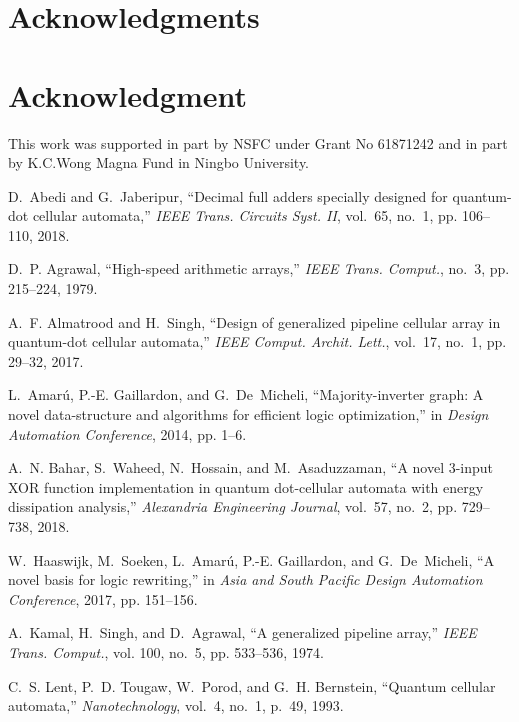 \documentclass[9pt,journal,compsoc]{IEEEtran}
\begin{document}
\vspace{-2ex}
\ifCLASSOPTIONcompsoc
  \section*{Acknowledgments}
\else
  \section*{Acknowledgment}
\fi
This work was supported in part by NSFC under Grant No 61871242 and in part by K.C.Wong Magna Fund in Ningbo University.
\vspace{-2ex}
\ifCLASSOPTIONcaptionsoff
  \newpage
\fi
\tiny


\begin{thebibliography}{10}

D.~{Abedi} and G.~{Jaberipur}, ``Decimal full adders specially designed for
  quantum-dot cellular automata,'' \emph{{IEEE} Trans. Circuits Syst. {II}},
  vol.~65, no.~1, pp. 106--110, 2018.

D.~P. Agrawal, ``High-speed arithmetic arrays,'' \emph{{IEEE} Trans. Comput.},
  no.~3, pp. 215--224, 1979.

A.~F. Almatrood and H.~Singh, ``Design of generalized pipeline cellular array
  in quantum-dot cellular automata,'' \emph{{IEEE} Comput. Archit. Lett.},
  vol.~17, no.~1, pp. 29--32, 2017.

L.~Amar{\'u}, P.-E. Gaillardon, and G.~De~Micheli, ``Majority-inverter graph: A
  novel data-structure and algorithms for efficient logic optimization,'' in
  \emph{Design Automation Conference}, 2014, pp. 1--6.

A.~N. Bahar, S.~Waheed, N.~Hossain, and M.~Asaduzzaman, ``A novel 3-input {XOR}
  function implementation in quantum dot-cellular automata with energy
  dissipation analysis,'' \emph{Alexandria Engineering Journal}, vol.~57,
  no.~2, pp. 729--738, 2018.

W.~Haaswijk, M.~Soeken, L.~Amar{\'u}, P.-E. Gaillardon, and G.~De~Micheli, ``A
  novel basis for logic rewriting,'' in \emph{Asia and South Pacific Design
  Automation Conference}, 2017, pp. 151--156.

A.~Kamal, H.~Singh, and D.~Agrawal, ``A generalized pipeline array,''
  \emph{{IEEE} Trans. Comput.}, vol. 100, no.~5, pp. 533--536, 1974.

C.~S. Lent, P.~D. Tougaw, W.~Porod, and G.~H. Bernstein, ``Quantum cellular
  automata,'' \emph{Nanotechnology}, vol.~4, no.~1, p.~49, 1993.


\end{thebibliography}
\end{document}
